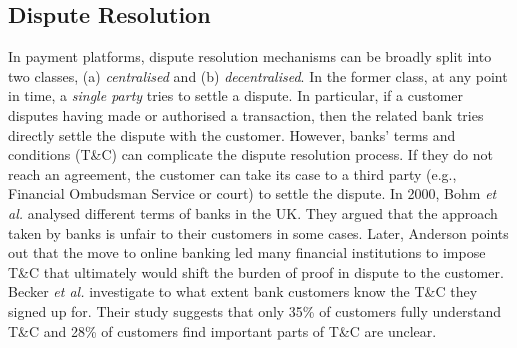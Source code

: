 \subsection{Dispute Resolution}
 \vspace{-1mm}
In payment platforms,  dispute resolution mechanisms can be broadly split into two classes, (a) \emph{centralised} and (b) \emph{decentralised}. In the former class,  at any point in time, a \emph{single party} tries to settle a dispute. In particular, if a customer disputes having made or authorised a transaction, then the related bank tries directly settle the dispute with the customer.  However,  banks' terms and conditions (T\&C) can complicate the dispute resolution process. If they do not reach an agreement, the customer can take its case to a third party (e.g., Financial Ombudsman Service or court) to settle the dispute. In 2000, Bohm \textit{et al.} \cite{BohmBG00} analysed different terms of banks in the UK. They argued that the approach taken by banks is unfair to their customers in some cases. Later,  Anderson  \cite{anderson2007closing} points out that the move to online banking led many financial institutions to impose T\&C  that ultimately would shift the burden of proof in dispute to the customer.    Becker \textit{et al.} \cite{BeckerHAABMSS17} investigate to what extent bank customers know the  T\&C they signed up for. Their study suggests that only 35\% of customers fully understand T\&C and  28\% of customers find important parts of T\&C are unclear.  











